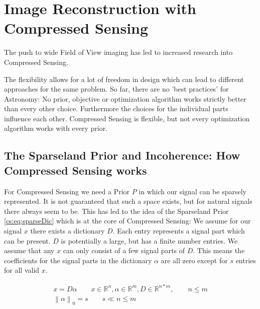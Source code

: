 \section{Image Reconstruction with Compressed Sensing} \label{cs}
The push to wide Field of View imaging has led to increased research into Compressed Sensing. 



The flexibility allows for a lot of freedom in design which can lead to different approaches for the same problem. So far, there are no 'best practices' for Astronomy: No prior, objective or optimization algorithm works strictly better than every other choice. Furthermore the choices for the individual parts influence each other. Compressed Sensing is flexible, but not every optimization algorithm works with every prior.



\subsection{The Sparseland Prior and Incoherence: How Compressed Sensing works}
For Compressed Sensing we need a Prior $P$ in which our signal can be sparsely represented. It is not guaranteed that such a space exists, but for natural signals there always seem to be. This has led to the idea of the Sparseland Prior \eqref{cs:eq:sparseDic} which is at the core of Compressed Sensing: We assume for our signal $x$ there exists a dictionary $D$. Each entry represents a signal part which can be present. $D$ is potentially a large, but has a finite number entries. We assume that any $x$ can only consist of a few signal parts of $D$. This means the coefficients for the signal parts in the dictionary $\alpha$ are all zero except for $s$ entries for all valid $x$. 

\begin{equation} \label{cs:eq:sparseDic}
	\begin{split}
		x = D \alpha  \qquad  x \in \mathbb{R}^{n}, \alpha \in \mathbb{R}^{m}, D \in \mathbb{R}^{n*m}, \qquad n \leq m \\
		\left \| \alpha \right \|_0 = s \qquad s \ll n \leq m
	\end{split}
\end{equation}

